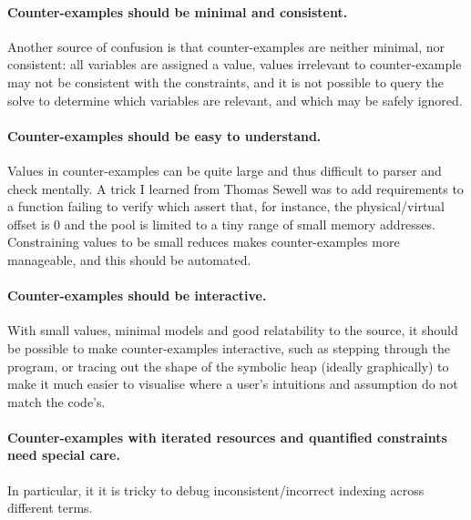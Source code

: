\paragraph{Counter-examples should be minimal and consistent.} Another source
of confusion is that counter-examples are neither minimal, nor consistent: all
variables are assigned a value, values irrelevant to counter-example may not be
consistent with the constraints, and it is not possible to query the solve to
determine which variables are relevant, and which may be safely ignored.

\paragraph{Counter-examples should be easy to understand.} Values in
counter-examples can be quite large and thus difficult to parser and check
mentally. A trick I learned from Thomas Sewell was to add requirements to a
function failing to verify which assert that, for instance, the
physical/virtual offset is 0 and the pool is limited to a tiny range of small
memory addresses. Constraining values to be small reduces makes
counter-examples more manageable, and this should be automated.

\paragraph{Counter-examples should be interactive.} With small values, minimal
models and good relatability to the source, it should be possible to make
counter-examples interactive, such as stepping through the program, or tracing
out the shape of the symbolic heap (ideally graphically) to make it much easier
to visualise where a user's intuitions and assumption do not match the code's.

\paragraph{Counter-examples with iterated resources and quantified constraints
need special care.} In particular, it it is tricky to debug
inconsistent/incorrect indexing across different terms.

